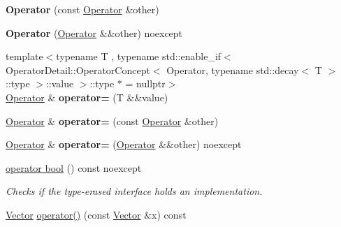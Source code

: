 \begin{DoxyCompactItemize}
\item 
{\bfseries Operator} (const \hyperlink{classSpacy_1_1Operator}{Operator} \&other)\hypertarget{classSpacy_1_1Operator_aba5b330a895d246b45dfdf99630e8a95}{}\label{classSpacy_1_1Operator_aba5b330a895d246b45dfdf99630e8a95}

\item 
{\bfseries Operator} (\hyperlink{classSpacy_1_1Operator}{Operator} \&\&other) noexcept\hypertarget{classSpacy_1_1Operator_ae16ebffeb1fa15d39a271b91eab7f749}{}\label{classSpacy_1_1Operator_ae16ebffeb1fa15d39a271b91eab7f749}

\item 
{\footnotesize template$<$typename T , typename std\+::enable\+\_\+if$<$ Operator\+Detail\+::\+Operator\+Concept$<$ Operator, typename std\+::decay$<$ T $>$\+::type $>$\+::value $>$\+::type $\ast$  = nullptr$>$ }\\\hyperlink{classSpacy_1_1Operator}{Operator} \& {\bfseries operator=} (T \&\&value)\hypertarget{classSpacy_1_1Operator_a05ad03a9a9f680740872ebcd580823df}{}\label{classSpacy_1_1Operator_a05ad03a9a9f680740872ebcd580823df}

\item 
\hyperlink{classSpacy_1_1Operator}{Operator} \& {\bfseries operator=} (const \hyperlink{classSpacy_1_1Operator}{Operator} \&other)\hypertarget{classSpacy_1_1Operator_a4231c7a32288c49b3b3905e8588f440e}{}\label{classSpacy_1_1Operator_a4231c7a32288c49b3b3905e8588f440e}

\item 
\hyperlink{classSpacy_1_1Operator}{Operator} \& {\bfseries operator=} (\hyperlink{classSpacy_1_1Operator}{Operator} \&\&other) noexcept\hypertarget{classSpacy_1_1Operator_a892a5bad4d03ed24fded8c0c31daac31}{}\label{classSpacy_1_1Operator_a892a5bad4d03ed24fded8c0c31daac31}

\item 
\hyperlink{classSpacy_1_1Operator_a001d31b07dd53fab2d0681cb8d6c9f6f}{operator bool} () const noexcept
\begin{DoxyCompactList}\small\item\em Checks if the type-\/erased interface holds an implementation. \end{DoxyCompactList}\item 
\hyperlink{classSpacy_1_1Vector}{Vector} \hyperlink{classSpacy_1_1Operator_a2ab6072d6f9d98e0d5590531c080e3ad}{operator()} (const \hyperlink{classSpacy_1_1Vector}{Vector} \&x) const \hypertarget{classSpacy_1_1Operator_a2ab6072d6f9d98e0d5590531c080e3ad}{}\label{classSpacy_1_1Operator_a2ab6072d6f9d98e0d5590531c080e3ad}


\end{DoxyCompactItemize}
